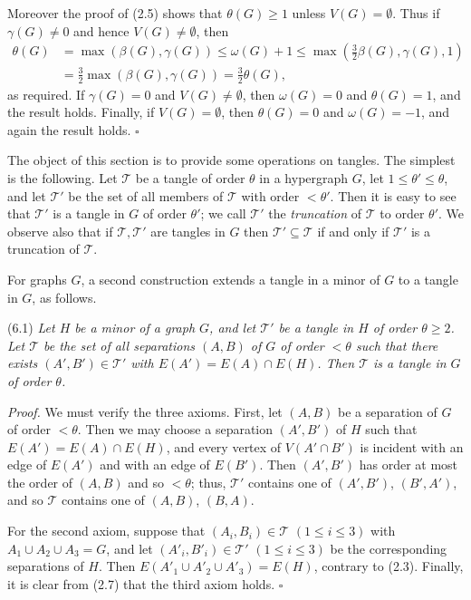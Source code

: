 Moreover the proof of (2.5) shows that $\theta(G) \ge 1$ unless $V(G) = \emptyset$. Thus if $\gamma(G) \ne 0$ and hence $V(G) \ne \emptyset$, then
\begin{align*}
\theta(G) &= \max(\beta(G), \gamma(G)) \le \omega(G) + 1 \le \max(\frac{3}{2}\beta(G), \gamma(G), 1) \\
&= \frac{3}{2}\max(\beta(G), \gamma(G)) = \frac{3}{2}\theta(G),
\end{align*}
as required. If $\gamma(G) = 0$ and $V(G) \ne \emptyset$, then $\omega(G) = 0$ and $\theta(G) = 1$, and the result holds. Finally, if $V(G) = \emptyset$, then $\theta(G) = 0$ and $\omega(G) = -1$, and again the result holds. $\square$


The object of this section is to provide some operations on tangles. The simplest is the following. Let $\mathscr{T}$ be a tangle of order $\theta$ in a hypergraph $G$, let $1 \le \theta' \le \theta$, and let $\mathscr{T}'$ be the set of all members of $\mathscr{T}$ with order $< \theta'$. Then it is easy to see that $\mathscr{T}'$ is a tangle in $G$ of order $\theta'$; we call $\mathscr{T}'$ the \textit{truncation} of $\mathscr{T}$ to order $\theta'$. We observe also that if $\mathscr{T}, \mathscr{T}'$ are tangles in $G$ then $\mathscr{T}' \subseteq \mathscr{T}$ if and only if $\mathscr{T}'$ is a truncation of $\mathscr{T}$.

For graphs $G$, a second construction extends a tangle in a minor of $G$ to a tangle in $G$, as follows.

\stmt
(6.1) \textit{Let $H$ be a minor of a graph $G$, and let $\mathscr{T}'$ be a tangle in $H$ of order $\theta \ge 2$. Let $\mathscr{T}$ be the set of all separations $(A, B)$ of $G$ of order $< \theta$ such that there exists $(A', B') \in \mathscr{T}'$ with $E(A') = E(A) \cap E(H)$. Then $\mathscr{T}$ is a tangle in $G$ of order $\theta$.}

\textit{Proof.} We must verify the three axioms. First, let $(A, B)$ be a separation of $G$ of order $< \theta$. Then we may choose a separation $(A', B')$ of $H$ such that $E(A') = E(A) \cap E(H)$, and every vertex of $V(A' \cap B')$ is incident with an edge of $E(A')$ and with an edge of $E(B')$. Then $(A', B')$ has order at most the order of $(A, B)$ and so $< \theta$; thus, $\mathscr{T}'$ contains one of $(A', B')$, $(B', A')$, and so $\mathscr{T}$ contains one of $(A, B)$, $(B, A)$.

For the second axiom, suppose that $(A_i, B_i) \in \mathscr{T}$ $(1 \le i \le 3)$ with $A_1 \cup A_2 \cup A_3 = G$, and let $(A'_i, B'_i) \in \mathscr{T}'$ $(1 \le i \le 3)$ be the corresponding separations of $H$. Then $E(A'_1 \cup A'_2 \cup A'_3) = E(H)$, contrary to (2.3). Finally, it is clear from (2.7) that the third axiom holds. $\square$

